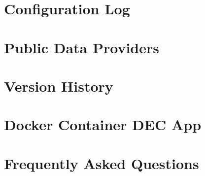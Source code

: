 \documentclass[
	oneside,
	openany,
	a4paper,
	headings=optiontoheadandtoc
	]{book}
\begin{document}
\chapter{Configuration Log}

 
\chapter{Public Data Providers}


\chapter{Version History}


\chapter{Docker Container DEC App}

 
\chapter{Frequently Asked Questions}

	
\end{document}
